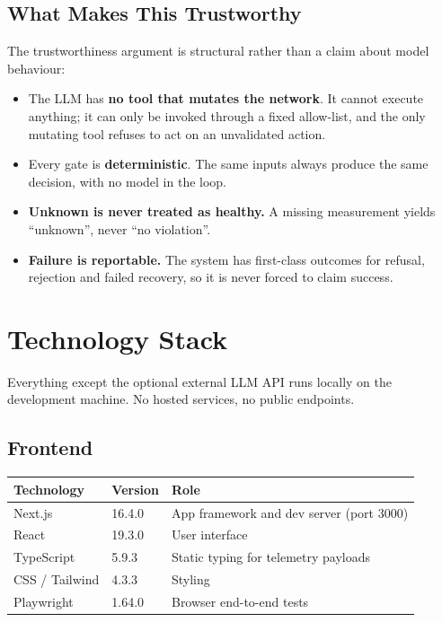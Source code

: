 \documentclass[12pt,a4paper]{report}
\begin{document}
\subsection{What Makes This Trustworthy}

The trustworthiness argument is structural rather than a claim about model
behaviour:

\begin{itemize}
    \item The LLM has \textbf{no tool that mutates the network}. It cannot
          execute anything; it can only be invoked through a fixed allow-list,
          and the only mutating tool refuses to act on an unvalidated action.
    \item Every gate is \textbf{deterministic}. The same inputs always produce
          the same decision, with no model in the loop.
    \item \textbf{Unknown is never treated as healthy.} A missing measurement
          yields ``unknown'', never ``no violation''.
    \item \textbf{Failure is reportable.} The system has first-class outcomes
          for refusal, rejection and failed recovery, so it is never forced to
          claim success.
\end{itemize}

\section{Technology Stack}

Everything except the optional external LLM API runs locally on the development
machine. No hosted services, no public endpoints.

\subsection{Frontend}

\begin{center}
\begin{tabular}{@{}L{3.2cm}L{2.8cm}L{7.8cm}@{}}
\toprule
\textbf{Technology} & \textbf{Version} & \textbf{Role} \\
\midrule
Next.js          & 16.4.0  & App framework and dev server (port 3000) \\
React            & 19.3.0  & User interface \\
TypeScript       & 5.9.3   & Static typing for telemetry payloads \\
CSS / Tailwind   & 4.3.3   & Styling \\
Playwright       & 1.64.0  & Browser end-to-end tests \\
\bottomrule
\end{tabular}
\end{center}
\end{document}
